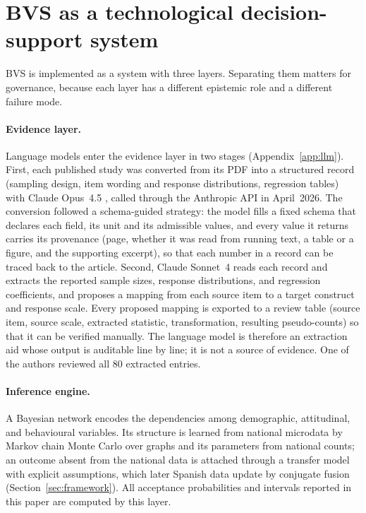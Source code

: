 \section{BVS as a technological decision-support system}
\label{sec:system}

BVS is implemented as a system with three layers. Separating them matters for
governance, because each layer has a different epistemic role and a different
failure mode.

\paragraph{Evidence layer.}
Language models enter the evidence layer in two stages
(Appendix~\ref{app:llm}). First, each published study was converted from its
PDF into a structured record (sampling design, item wording and response
distributions, regression tables) with Claude Opus~4.5 \citep{anthropic2025opus},
called through the Anthropic API in April~2026. The conversion followed a
schema-guided strategy:
the model fills a fixed schema that declares each field, its unit and its
admissible values, and every value it returns carries its provenance (page,
whether it was read from running text, a table or a figure, and the supporting
excerpt), so that each number in a record can be traced back to the article.
 Second, Claude Sonnet~4
\citep{anthropic2025sonnet} reads each record and extracts the reported sample
sizes, response distributions, and regression coefficients, and proposes a
mapping from each source item to a target construct and response scale. Every proposed mapping is exported to a
review table (source item, source scale, extracted statistic, transformation,
resulting pseudo-counts) so that it can be verified manually. The language
model is therefore an extraction aid whose output is auditable line by line; it
is not a source of evidence. One of the authors reviewed all 80 extracted entries.

\paragraph{Inference engine.}
A Bayesian network encodes the dependencies among demographic, attitudinal, and
behavioural variables. Its structure is learned from national microdata by
Markov chain Monte Carlo over graphs and its parameters from national counts;
an outcome absent from the national data is attached through a transfer model
with explicit assumptions, which later Spanish data update by conjugate fusion
(Section~\ref{sec:framework}). All acceptance
probabilities and intervals reported in this paper are computed by this layer.

